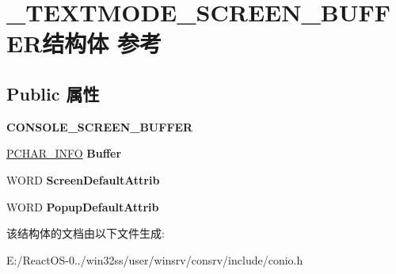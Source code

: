 \hypertarget{struct___t_e_x_t_m_o_d_e___s_c_r_e_e_n___b_u_f_f_e_r}{}\section{\+\_\+\+T\+E\+X\+T\+M\+O\+D\+E\+\_\+\+S\+C\+R\+E\+E\+N\+\_\+\+B\+U\+F\+F\+E\+R结构体 参考}
\label{struct___t_e_x_t_m_o_d_e___s_c_r_e_e_n___b_u_f_f_e_r}
\subsection*{Public 属性}
\begin{DoxyCompactItemize}
\item 
\mbox{\label{struct___t_e_x_t_m_o_d_e___s_c_r_e_e_n___b_u_f_f_e_r_a0fe3f136fbba55f4876b8570431c35c0}} 
{\bfseries C\+O\+N\+S\+O\+L\+E\+\_\+\+S\+C\+R\+E\+E\+N\+\_\+\+B\+U\+F\+F\+ER}
\item 
\mbox{\label{struct___t_e_x_t_m_o_d_e___s_c_r_e_e_n___b_u_f_f_e_r_a3f3e60639ab82bb5247fa2b98b509ac8}} 
\hyperlink{struct___c_h_a_r___i_n_f_o}{P\+C\+H\+A\+R\+\_\+\+I\+N\+FO} {\bfseries Buffer}
\item 
\mbox{\label{struct___t_e_x_t_m_o_d_e___s_c_r_e_e_n___b_u_f_f_e_r_aa64743a50b9c9b88872931cc062b91ab}} 
W\+O\+RD {\bfseries Screen\+Default\+Attrib}
\item 
\mbox{\label{struct___t_e_x_t_m_o_d_e___s_c_r_e_e_n___b_u_f_f_e_r_aeb1c0dcfa725477b31511939782ba54f}} 
W\+O\+RD {\bfseries Popup\+Default\+Attrib}
\end{DoxyCompactItemize}


该结构体的文档由以下文件生成\+:\begin{DoxyCompactItemize}
\item 
E\+:/\+React\+O\+S-\/0../win32ss/user/winsrv/consrv/include/conio.\+h\end{DoxyCompactItemize}
